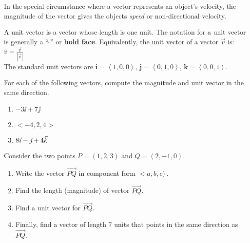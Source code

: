 In the special circumstance where a vector represents an object's velocity, the magnitude of the vector gives the objects \textit{speed} or non-directional velocity. 

\begin{definition} A unit vector is a vector whose length is one unit. The notation for a unit vector is generally a ``$\hat{\ }$'' or \textbf{bold face}. Equivalently, the unit vector of a vector $\vec{v}$ is: $\hat{v}=\frac{\vec{v}}{|\vec{v}|}$\\
The standard unit vectors are $\mathbf{i}=\left<1,0,0\right>$, $\mathbf{j}=\left<0,1,0\right>$, $\mathbf{k}=\left<0,0,1\right>$. 
\end{definition}

\begin{problem}
For each of the following vectors, compute the magnitude and unit vector in the same direction.
\begin{enumerate}
	\item $-3\ii + 7 \jj$ 
	\item $<-4,2,4>$ 
	\item $8\vec \imath - \vec \jmath + 4 \vec k$ 
\end{enumerate}
\end{problem}

\begin{problem}
%
Consider the two points $P=(1,2,3)$ and $Q=(2,-1,0)$. 
\begin{enumerate}
	\item Write the vector $\vec {PQ}$ in component form $<a,b,c)\>$. 
	\item Find the length (magnitude) of vector $\vec {PQ}$. 
	\item Find a unit vector for $\vec{PQ}$. 
	\item Finally, find a vector of length 7 units that points in the same direction as $\vec{PQ}$. 
\end{enumerate}
\end{problem}

